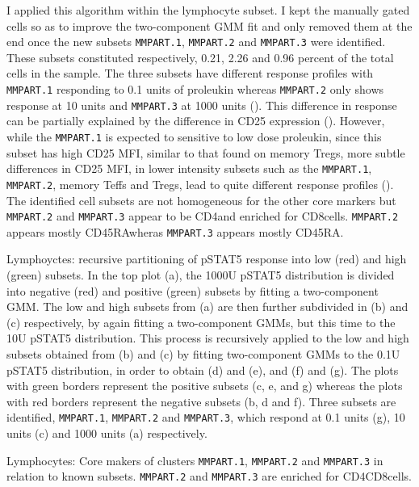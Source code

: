 I applied this algorithm within the lymphocyte subset.
I kept the manually gated cells so as to improve the two-component GMM fit and only removed them at the end once the new subsets \texttt{MMPART.1}, \texttt{MMPART.2} and
\texttt{MMPART.3} were identified.
These subsets constituted respectively, 0.21, 2.26 and 0.96 percent of the total cells in the sample.
The three subsets have different response profiles with \texttt{MMPART.1} responding to 0.1 units of proleukin
whereas \texttt{MMPART.2} only shows response at 10 units and \texttt{MMPART.3} at 1000 units ().
This difference in response can be partially explained by the difference in CD25 expression ().
However, while the \texttt{MMPART.1} is expected to sensitive to low dose proleukin, since this subset has high CD25 MFI, similar to that found on memory Tregs,
more subtle differences in CD25 MFI, in lower intensity subsets such as the \texttt{MMPART.1}, \texttt{MMPART.2}, memory Teffs and Tregs,
lead to quite different response profiles ().
The identified cell subsets are not homogeneous for the other core markers but \texttt{MMPART.2} and \texttt{MMPART.3} appear to be CD4\negative and enriched for CD8\positive cells.
\texttt{MMPART.2} appears mostly CD45RA\negative wheras \texttt{MMPART.3} appears mostly CD45RA\positive.


%
{ Lymphoyctes: recursive partitioning of pSTAT5 response into low (red) and high (green) subsets. }
{
    In the top plot (a), the 1000U pSTAT5 distribution is divided into negative (red) and positive (green) subsets by fitting a two-component \gls{GMM}.
    The low and high subsets from (a) are then further subdivided in (b) and (c) respectively, by again fitting a two-component \glspl{GMM},
    but this time to the 10U pSTAT5 distribution.
    This process is recursively applied to the low and high subsets obtained from (b) and (c) by fitting two-component \glspl{GMM} to the 0.1U pSTAT5 distribution, in order
    to obtain (d) and (e), and (f) and (g).
    The plots with green borders represent the positive subsets (c, e, and g) whereas the plots with red borders represent the negative subsets (b, d and f).
    Three subsets are identified, \texttt{MMPART.1}, \texttt{MMPART.2} and \texttt{MMPART.3}, which respond at 0.1 units (g), 10 units (c) and 1000 units (a) respectively.
}

%
{ Lymphocytes: Core makers of clusters \texttt{MMPART.1}, \texttt{MMPART.2} and \texttt{MMPART.3} in relation to known subsets. }
{ 
    \texttt{MMPART.2} and \texttt{MMPART.3} are enriched for CD4\negative CD8\positive cells.
}

